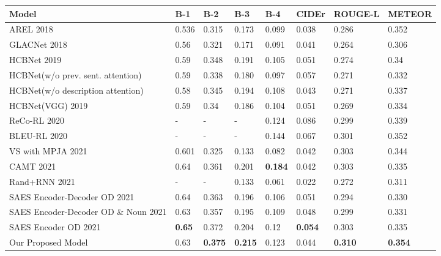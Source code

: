 \documentclass[runningheads]{llncs}
\begin{document}
\begin{table}[t]
{\begin{tabular}{|l|l|l|l|l|l|l|l|}
\hline
\textbf{Model}  & \textbf{B-1} & \textbf{B-2} & \textbf{B-3} & \textbf{B-4} & \textbf{CIDEr} & \textbf{ROUGE-L} & \textbf{METEOR}  \\
\hline \hline
AREL 2018 \cite{wang2018no}& 0.536 & 0.315 & 0.173 & 0.099  & 0.038  & 0.286 & 0.352  \\
\hline
GLACNet 2018 \cite{kim2018glac}& 0.56 & 0.321 & 0.171 & 0.091 & 0.041  & 0.264 & 0.306  \\
\hline
HCBNet 2019 \cite{al2019hierarchical} & 0.59 & 0.348 & 0.191 & 0.105 & 0.051  & 0.274 & 0.34  \\
\hline
HCBNet(w/o prev. sent. attention) \cite{al2019hierarchical}& 0.59 & 0.338 & 0.180 & 0.097 & 0.057  & 0.271 & 0.332   \\
\hline
HCBNet(w/o description attention) \cite{al2019hierarchical} & 0.58 & 0.345 & 0.194 & 0.108 & 0.043  & 0.271 & 0.337  \\
\hline
HCBNet(VGG) 2019 \cite{al2019hierarchical} & 0.59 & 0.34  & 0.186 & 0.104 & 0.051 & 0.269 & 0.334   \\
\hline
ReCo-RL 2020 \cite{hu2020makes} & -& - & - & 0.124 & 0.086 & 0.299 & 0.339   \\
\hline
BLEU-RL 2020 \cite{hu2020makes} & -& - & - & 0.144 & 0.067 & 0.301 & 0.352  \\
\hline
VS with MPJA 2021 \cite{guo2021steganographic} & 0.601 & 0.325 & 0.133& 0.082 & 0.042  & 0.303  & 0.344 \\
\hline
CAMT 2021 \cite{visapp21} & 0.64 & 0.361 & 0.201  & \textbf{0.184} & 0.042  & 0.303  & 0.335 \\
\hline
Rand+RNN 2021 \cite{chen2021commonsense} & - & - & 0.133  & 0.061 & 0.022  & 0.272  & 0.311 \\
\hline
SAES Encoder-Decoder OD 2021 \cite{9647213}  & 0.64 & 0.363 & 0.196  & 0.106 & 0.051  & 0.294 & 0.330  \\
\hline
SAES Encoder-Decoder OD \& Noun 2021 \cite{9647213}   & 0.63 & 0.357 & 0.195 & 0.109 & 0.048 & 0.299 & 0.331  \\
\hline
SAES Encoder OD 2021 \cite{9647213}  & \textbf{0.65} & 0.372 & 0.204  & 0.12 & \textbf{0.054}  & 0.303 & 0.335  \\
\hline \hline
Our Proposed Model  & 0.63 & \textbf{0.375} & \textbf{0.215}  & 0.123 & 0.044  & \textbf{0.310} & \textbf{0.354}  \\
\hline
\end{tabular}}

\end{table}
\end{document}
